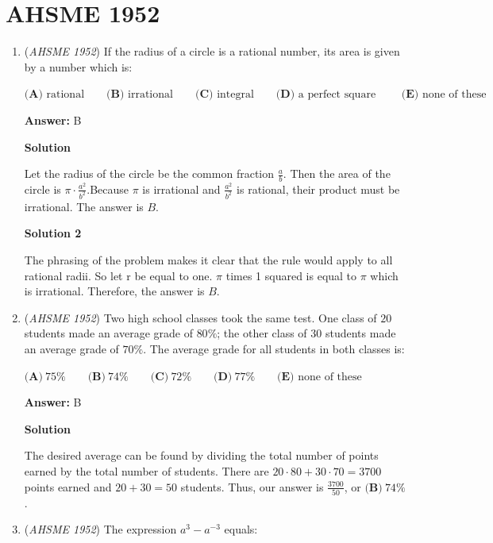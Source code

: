 \section{AHSME 1952}
        \begin{enumerate}
        	\item (\textit{AHSME 1952}) If the radius of a circle is a rational number, its area is given by a number which is:


 $\textbf{(A)\ } \text{rational}  \qquad \textbf{(B)\ } \text{irrational} \qquad \textbf{(C)\ } \text{integral} \qquad \textbf{(D)\ } \text{a perfect square }\qquad \textbf{(E)\ } \text{none of these}$

 \textbf{Answer: }B



\textbf{Solution}

Let the radius of the circle be the common fraction $\frac{a}{b}.$ Then the area of the circle is $\pi \cdot \frac{a^2}{b^2}.$Because $\pi$ is irrational and $\frac{a^2}{b^2}$ is rational, their product must be irrational. The answer is $\boxed{B}.$




\textbf{Solution 2}

The phrasing of the problem makes it clear that the rule would apply to all rational radii. So let r be equal to one. $\pi$ times 1 squared is equal to $\pi$ which is irrational. Therefore, the answer is $\boxed{B}.$



	\item (\textit{AHSME 1952}) Two high school classes took the same test. One class of $20$ students made an average grade of $80\%$; the other class of $30$ students made an average grade of $70\%$. The average grade for all students in both classes is:


 $\textbf{(A)}\ 75\%\qquad \textbf{(B)}\ 74\%\qquad \textbf{(C)}\ 72\%\qquad \textbf{(D)}\ 77\%\qquad \textbf{(E)\ }\text{none of these}$

 \textbf{Answer: }B



\textbf{Solution}

The desired average can be found by dividing the total number of points earned by the total number of students. There are $20\cdot 80+30\cdot 70=3700$ points earned and $20+30=50$ students. Thus, our answer is $\frac{3700}{50}$, or $\boxed{\textbf{(B)}\ 74\%}$.

 


	\item (\textit{AHSME 1952}) The expression $a^3-a^{-3}$ equals: 



\end{enumerate}
